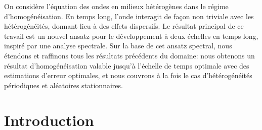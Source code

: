 \documentclass[JEP,XML,SOM,Unicode,published]{cedram}
\theoremstyle{plain}
\theoremstyle{definition}
\numberwithin{equation}{section}
\begin{document}




\begin{altabstract}
On considère l'équation des ondes en milieux hétérogènes dans le régime d'homogénéisation. En temps long, l'onde interagit de façon non triviale avec les hétérogénéités, donnant lieu à des effets dispersifs. Le résultat principal de ce travail est un nouvel ansatz pour le développement à deux échelles en temps long, inspiré par une analyse spectrale. Sur la base de cet ansatz spectral, nous étendons et raffinons tous les résultats précédents du domaine: nous obtenons un résultat d'homogénéisation valable jusqu'à l'échelle de temps optimale avec des estimations d'erreur optimales, et nous couvrons à la fois le cas d’hétérogénéités périodiques et aléatoires stationnaires.
\end{altabstract}

\maketitle
\vspace*{-\baselineskip}
\tableofcontents


\section{Introduction}
\end{document}
